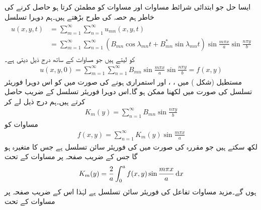 \quad ایسا حل جو ابتدائی شرائط مساوات  اور مساوات  کو مطمئن کرتا ہو حاصل کرنے کی خاطر ہم  حصہ  کی طرح بڑھتے ہیں۔ہم دوہرا تسلسل
\begin{gather}
\begin{aligned}\label{مساوات_جزوی_مکمل_حل_مستطیل_جھلی}
u(x,y,t)&=\sum_{m=1}^{\infty}\sum_{n=1}^{\infty} u_{mn}(x,y,t)\\
&=\sum_{m=1}^{\infty}\sum_{n=1}^{\infty}(B_{mn}\cos \lambda_{mn}t+B^*_{mn}\sin \lambda_{mn}t)\sin\frac{m\pi x}{a}\sin \frac{n\pi y}{b}
\end{aligned}
\end{gather}
کو لیتے ہیں جو مساوات  کے ساتھ درج ذیل   دیتی ہے۔
\begin{align}\label{مساوات_جزوی_دوہرا_فوریئر_تسلسل_الف}
u(x,y,0)=\sum_{m=1}^{\infty}\sum_{n=1}^{\infty}B_{mn}\sin\frac{m\pi x}{a}\sin \frac{n\pi y}{b}=f(x,y)
\end{align}
مستطیل  (شکل ) میں ، ،  اور  استمراری ہونے کی صورت میں  کو اس دوہرا فوریئر تسلسل کی صورت میں لکھنا ممکن ہو گا۔اس دوہرا فوریئر تسلسل کے  ضریب  حاصل کرتے ہیں۔ہم درج ذیل لے کر
\begin{align}\label{مساوات_جزوی_دوہرا_فوریئر_تسلسل_ب}
K_m(y)=\sum_{n=1}^{\infty}B_{mn}\sin \frac{n\pi y}{b}
\end{align}
مساوات  کو
\begin{align}\label{مساوات_جزوی_دوہرا_فوریئر_تسلسل_پ}
f(x,y)=\sum_{n=1}^{\infty}K_m(y)\sin \frac{m\pi x}{a}
\end{align}
لکھ سکتے ہیں جو مقررہ  کی صورت میں  کی  فوریئر سائن تسلسل ہے جس کا متغیرہ  ہو گا جس کے  ضریب  صفحہ  پر مساوات  کے تحت
\begin{align}\label{مساوات_جزوی_دوہرا_فوریئر_تسلسل_ت}
K_m(y)=\frac{2}{a}\int_0^a f(x,y)\sin\frac{m\pi x}{a}\dif x
\end{align}
ہوں گے۔مزید مساوات  تفاعل  کی فوریئر سائن تسلسل ہے لہٰذا اس کے  ضریب  صفحہ  پر مساوات  کے تحت

